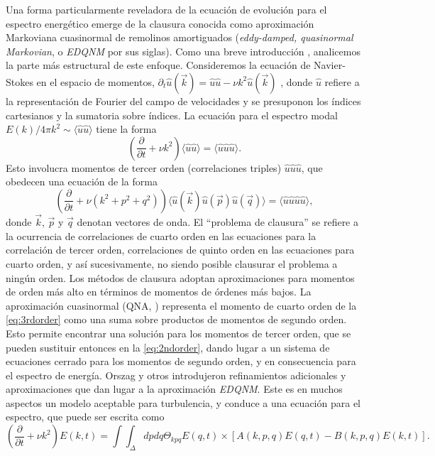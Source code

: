 Una forma particularmente reveladora de la ecuación de evolución para
el espectro energético emerge de la clausura conocida como
aproximación Markoviana cuasinormal de remolinos amortiguados
(\textit{eddy-damped, quasinormal Markovian}, o \textit{EDQNM} por sus
siglas). Como una breve introducción \cite{orszag_analytical_1970,
  monin_statistical_2013, mccomb_physics_1990,
  lesieur_turbulence_2008}, analicemos la parte más estructural de
este enfoque.  Consideremos la ecuación de Navier-Stokes en el espacio
de momentos, $\partial_t \hat{u}(\vec{k}) = \hat{u}\hat{u} - \nu k^2
\hat{u}(\vec{k})$ \cite{lesieur_turbulence_2008}, donde $\hat{u}$
refiere a la representación de Fourier del campo de velocidades y se
presuponon los índices cartesianos y la sumatoria sobre índices. La
ecuación para el espectro modal $E(k)/4\pi k^2 \sim \langle
\hat{u}\hat{u} \rangle$ tiene la forma
\begin{equation}\label{eq:2ndorder}
  \left(\frac{\partial}{\partial t} + \nu k^2 \right) \langle \hat{u} \hat{u} \rangle = \langle \hat{u} \hat{u} \hat{u} \rangle.
\end{equation}
Esto involucra momentos de tercer orden (correlaciones triples)
$\hat{u}\hat{u}\hat{u}$, que obedecen una ecuación de la forma
\begin{equation}\label{eq:3rdorder}
  \left(\frac{\partial}{\partial t} + \nu \left(k^2+p^2+q^2\right) \right) \langle \hat{u}(\vec{k}) \hat{u}(\vec{p}) \hat{u}(\vec{q}) \rangle = \langle \hat{u} \hat{u} \hat{u} \hat{u} \rangle,
\end{equation}
donde $\vec{k}$, $\vec{p}$ y $\vec{q}$ denotan vectores de onda. El
``problema de clausura'' se refiere a la ocurrencia de correlaciones
de cuarto orden en las ecuaciones para la correlación de tercer orden,
correlaciones de quinto orden en las ecuaciones para cuarto orden, y
así sucesivamente, no siendo posible clausurar el problema a ningún
orden. Los métodos de clausura adoptan aproximaciones para momentos de
orden más alto en términos de momentos de órdenes más bajos. La
aproximación cuasinormal (QNA, \cite{millionshchikov_1941}) representa
el momento de cuarto orden de la \cref{eq:3rdorder} como una suma
sobre productos de momentos de segundo orden. Esto permite encontrar
una solución para los momentos de tercer orden, que se pueden
sustituir entonces en la \cref{eq:2ndorder}, dando lugar a un sistema
de ecuaciones cerrado para los momentos de segundo orden, y en
consecuencia para el espectro de energía. Orszag
\cite{orszag_analytical_1970} y otros introdujeron refinamientos
adicionales y aproximaciones que dan lugar a la aproximación
\textit{EDQNM}. Este es en muchos aspectos un modelo aceptable para
turbulencia, y conduce a una ecuación para el espectro, que puede ser
escrita como
\begin{equation}\label{eq:spectrumeq}
  \left( \frac{\partial}{\partial t} + \nu k^2 \right) E(k, t) = \int\int_\Delta dp dq \Theta_{kpq} E(q,t) \times \left[ A(k, p, q) E(q, t) - B(k, p, q) E(k, t)\right].
\end{equation}

